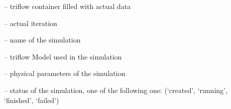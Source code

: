 \documentclass[letterpaper,10pt,english]{sphinxmanual}
\begin{document}
\begin{fulllineitems}

\begin{fulllineitems}
\label{\detokenize{triflow.core:triflow.core.simulation.Simulation.fields}}
 -- triflow container filled with actual data

\end{fulllineitems}


\begin{fulllineitems}
\label{\detokenize{triflow.core:triflow.core.simulation.Simulation.i}}
 -- actual iteration

\end{fulllineitems}


\begin{fulllineitems}
\label{\detokenize{triflow.core:triflow.core.simulation.Simulation.id}}
 -- name of the simulation

\end{fulllineitems}


\begin{fulllineitems}
\label{\detokenize{triflow.core:triflow.core.simulation.Simulation.model}}
 -- triflow Model used in the simulation

\end{fulllineitems}


\begin{fulllineitems}
\label{\detokenize{triflow.core:triflow.core.simulation.Simulation.physical_parameters}}
 -- physical parameters of the simulation

\end{fulllineitems}


\begin{fulllineitems}
\label{\detokenize{triflow.core:triflow.core.simulation.Simulation.status}}
 -- status of the simulation, one of the following one: (`created', `running', `finished', `failed')


\end{fulllineitems}
\end{fulllineitems}
\end{document}
